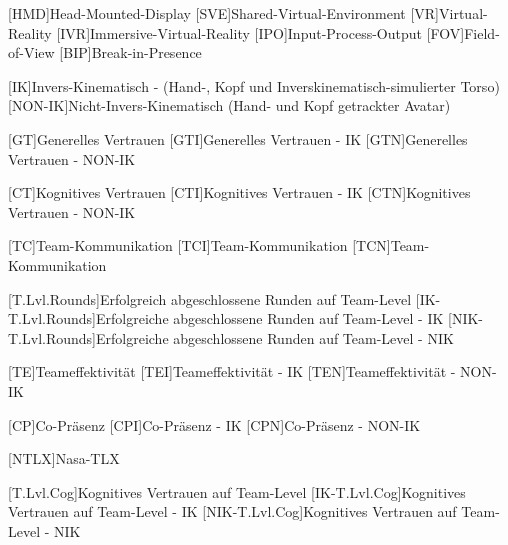 \begin{acronym}
	[HMD]{Head-Mounted-Display}
	[SVE]{Shared-Virtual-Environment}
	[VR]{Virtual-Reality}
	[IVR]{Immersive-Virtual-Reality}
	[IPO]{Input-Process-Output}
	[FOV]{Field-of-View}
	[BIP]{Break-in-Presence}
	
	[IK]{Invers-Kinematisch - (Hand-, Kopf und Inverskinematisch-simulierter Torso)}
	[NON-IK]{Nicht-Invers-Kinematisch (Hand- und Kopf getrackter Avatar)}
	
	[GT]{Generelles Vertrauen}
	[GTI]{Generelles Vertrauen - IK}
	[GTN]{Generelles Vertrauen - NON-IK}
	
	[CT]{Kognitives Vertrauen}
	[CTI]{Kognitives Vertrauen - IK}
	[CTN]{Kognitives Vertrauen - NON-IK}
	
	[TC]{Team-Kommunikation}
	[TCI]{Team-Kommunikation}
	[TCN]{Team-Kommunikation}
	
	[T.Lvl.Rounds]{Erfolgreich abgeschlossene Runden auf Team-Level}
	[IK-T.Lvl.Rounds]{Erfolgreiche abgeschlossene Runden auf Team-Level - IK}
	[NIK-T.Lvl.Rounds]{Erfolgreiche abgeschlossene Runden auf Team-Level - NIK}
	
	[TE]{Teameffektivität}
	[TEI]{Teameffektivität - IK}
	[TEN]{Teameffektivität - NON-IK}
	
	[CP]{Co-Präsenz}
	[CPI]{Co-Präsenz - IK}
	[CPN]{Co-Präsenz - NON-IK}
	
	[NTLX]{Nasa-TLX}
	
	[T.Lvl.Cog]{Kognitives Vertrauen auf Team-Level}
	[IK-T.Lvl.Cog]{Kognitives Vertrauen auf Team-Level - IK}
	[NIK-T.Lvl.Cog]{Kognitives Vertrauen auf Team-Level - NIK}
	
\end{acronym}

